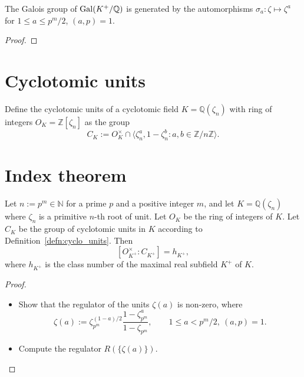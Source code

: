 \begin{lemma}\label{lem:gal_K_plus}
    The Galois group of $\operatorname{Gal}(K^+ / \mathbb{Q})$ is generated by the 
    automorphisms $\sigma_a \colon \zeta \mapsto \zeta^a$ for $1 \leq a \leq p^m / 2$, $(a, p) = 1$. 
\end{lemma}

\begin{proof}
\end{proof}

\section{Cyclotomic units}
\begin{definition}\label{defn:cyclo_units}
    Define the cyclotomic units of a cyclotomic field $K = \mathbb{Q}(\zeta_n)$ with ring of integers 
    $O_K = \mathbb{Z}[\zeta_n]$ as the group 
    $$
    C_K := O_K^\times \cap \langle \zeta_n^a, 1 - \zeta_n^b \colon a, b \in \mathbb{Z} / n \mathbb{Z}\rangle. 
    $$
\end{definition}

\section{Index theorem}
\begin{theorem}\label{thm:index_of_units}
    \notready
    Let $n := p^m \in \mathbb{N}$ for a prime $p$ and a positive integer $m$, and let $K = \mathbb{Q}(\zeta_n)$ where $\zeta_n$ is a primitive $n$-th root of unit. 
    Let $O_K$ be the ring of integers of $K$. 
    Let $C_K$ be the group of cyclotomic units in $K$ according to Definition~\ref{defn:cyclo_units}.
    Then
    \[
        [O_{K^+}^\times : C_{K^+}] = h_{K^+},
    \]
    where $h_{K^+}$ is the class number of the maximal real subfield $K^+$ of $K$.
\end{theorem}

\begin{proof}
    \begin{itemize}
        \item Show that the regulator of the units $\zeta(a)$ is non-zero, where 
        $$
        \zeta(a) := \zeta_{p^m}^{(1-a)/2} \frac{1 - \zeta_{p^m}^a}{1 - \zeta_{p^m}}, \qquad 1 \leq a < p^m / 2, \ (a, p) = 1.
        $$
        \item Compute the regulator $R(\{\zeta(a)\})$. 
    \end{itemize}
\end{proof}

